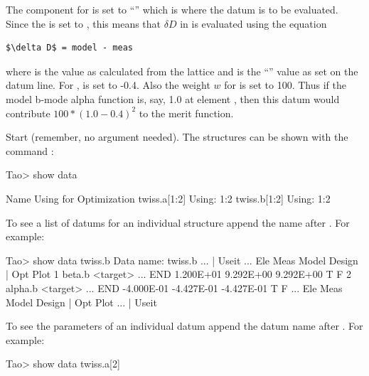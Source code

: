 \documentclass{hitec}     %
\begin{document}
{The  component for  is set to ``'' which is where the datum is
to be evaluated. Since the  is set to , this means that $\delta D$ in
 is evaluated using the equation
\begin{lstlisting}[mathescape]
$\delta D$ = model - meas
\end{lstlisting}
where  is the value as calculated from the  lattice and  is the
``'' value as set on the datum line. For ,  is set to -0.4.
Also the weight $w$ for  is set to 100.  Thus if the model b-mode alpha function is, say,
1.0 at element , then this datum would contribute $100*(1.0 - 0.4)^2$ to the merit function.

Start \tao (remember, no  argument needed). The  structures can be shown with
the command :
\begin{code}
Tao> show data

  Name                                 Using for Optimization
  twiss.a[1:2]                                   Using: 1:2
  twiss.b[1:2]                                   Using: 1:2
\end{code}

To see a list of datums for an individual  structure append the  name after .
For example:
\begin{code}
Tao> show data twiss.b
Data name: twiss.b
                    ...                                           |   Useit
                    ...  Ele         Meas       Model      Design | Opt  Plot
1  beta.b <target>  ...  END    1.200E+01   9.292E+00   9.292E+00     T     F
2  alpha.b <target> ...  END   -4.000E-01  -4.427E-01  -4.427E-01     T     F
                    ...  Ele         Meas       Model      Design | Opt  Plot
                    ...                                           |   Useit
\end{code}

To see the parameters of an individual datum append the datum name after .
For example:
\begin{code}
Tao> show data twiss.a[2]


\end{code}}
\end{document}
